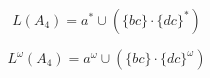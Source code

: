 \[L(A_4)={a}^* \cup (\{bc\}\cdot\{dc\}^*)\]


\[L^\omega(A_4)={a}^\omega \cup (\{bc\} \cdot \{dc\}^\omega)\]